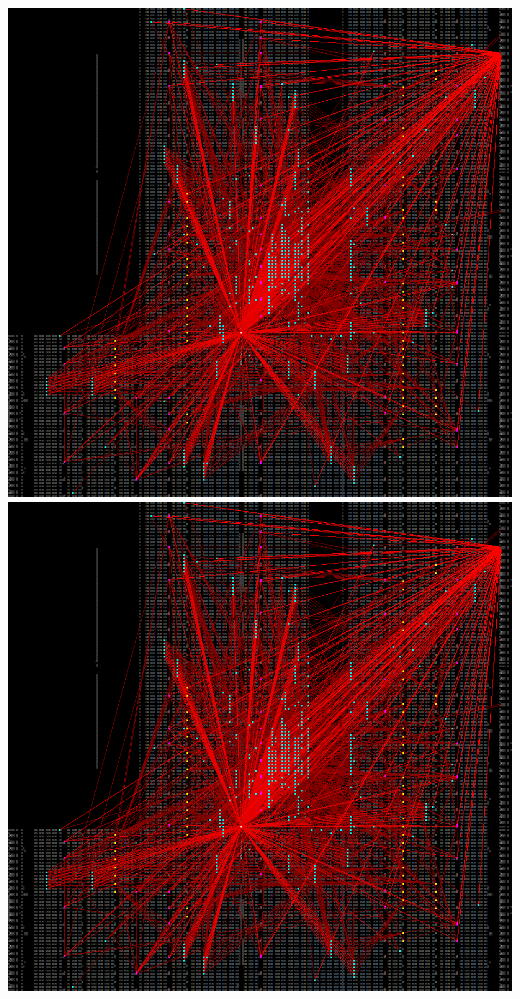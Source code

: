 {    \includegraphics[valign=t, scale=0.13]{figures/results/PlacerGreedyMidpoint/00000100.png}
    \includegraphics[valign=t, scale=0.13]{figures/results/PlacerGreedyMidpoint/00000299.png}
    \label{fig:PGMSnapshots}
}
